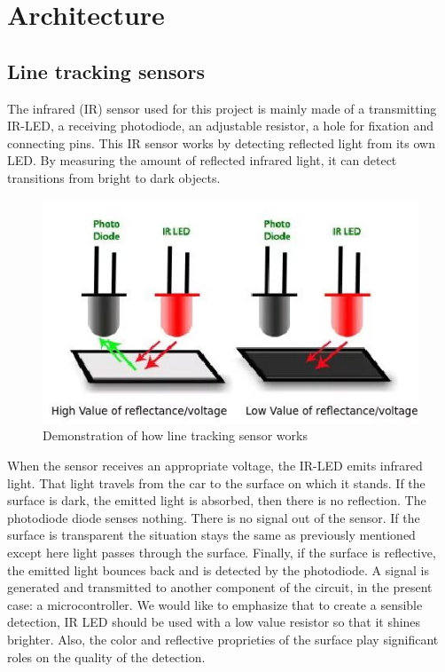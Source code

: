 \documentclass[conference]{IEEEtran}
\begin{document}
\section{Architecture}
\subsection{Line tracking sensors}
The infrared (IR) sensor used for this project is mainly made of a transmitting IR-LED, a receiving photodiode, an adjustable resistor, a hole for fixation and connecting pins. This IR sensor works by detecting reflected light from its own LED. By measuring the amount of reflected infrared light, it can detect transitions from bright to dark objects.
\begin{figure}[h!]
	\includegraphics[width=\linewidth]{LineTrackingSensors.png}
	\caption{Demonstration of how line tracking sensor works}
	\label{fig:UMLSM1}
\end{figure}
When the sensor receives an appropriate voltage, the IR-LED emits infrared light. That light travels from the car to the surface on which it stands. If the surface is dark, the emitted light is absorbed, then there is no reflection. The photodiode diode senses nothing. There is no signal out of the sensor. If the surface is transparent the situation stays the same as previously mentioned except here light passes through the surface. Finally, if the surface is reflective, the emitted light bounces back and is detected by the photodiode. A signal is generated and transmitted to another component of the circuit, in the present case: a microcontroller.  
We would like to emphasize that to create a sensible detection, IR LED should be used with a low value resistor so that it shines brighter. Also, the color and reflective proprieties of the surface play significant roles on the quality of the detection. 
\end{document}

